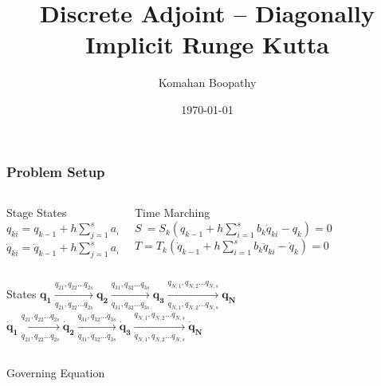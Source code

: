 \documentclass{beamer}
\title[\hspace{-0.2cm} DIRK Adjoint]
{
Discrete Adjoint -- Diagonally Implicit Runge Kutta
}
\author[Komahan Boopathy]
{
  \Large {Komahan Boopathy}\\
}
\institute
{
  \large Georgia Institute of Technology\\
 School of Aerospace Engineering\\
 Atlanta, GA
}
\date
{
\small \today
}
\begin{document}
\begin{frame}
  \titlepage
\end{frame}


\begin{frame}[allowframebreaks] \frametitle{Problem Setup}

  \begin{columns}[T] %
    \begin{column}{.42\textwidth}
      \begin{block}{Stage States}\medskip
        ${q_{ki}} = q_{k-1} + h \sum_{j=1}^s a_{ij} \dot{q}_{kj}$\\
        ${\dot{q}_{ki}} = \dot{q}_{k-1} + h \sum_{j=1}^s a_{ij} \ddot{q}_{kj}$
      \end{block}
    \end{column}%
    \hfill
    \begin{column}{.58\textwidth}
      \begin{block}{Time Marching}\medskip
        $S ~= S_k(q_{k-1} + h \sum_{i=1}^s b_k \dot{q}_{ki} - q_{k})  = 0$
        $T=T_k(\dot{q}_{k-1} + h \sum_{i=1}^s b_k \ddot{q}_{ki} - \dot{q}_{k})  = 0$
      \end{block}
    \end{column}%
  \end{columns}
  \medskip
  \begin{block}{States}\centering
    $\mathbf{q_1} \xrightarrow[\dot{q}_{21},\dot{q}_{22}\ldots\dot{q}_{2s}]{q_{21},q_{22}\ldots q_{2s}} \mathbf{q_2} \xrightarrow[\dot{q}_{31},\dot{q}_{32}\ldots\dot{q}_{3s}]{q_{31},q_{32}\ldots q_{3s}} \mathbf{q_3} \xrightarrow[\dot{q}_{N,1},\dot{q}_{N,2}\ldots\dot{q}_{N,s}]{q_{N,1},q_{N,2}\ldots q_{N,s}} \mathbf{q_N}$
    $\mathbf{\dot{q}_1} \xrightarrow[\ddot{q}_{21},\ddot{q}_{22}\ldots\ddot{q}_{2s}]{\dot{q}_{21},\dot{q}_{22}\ldots \dot{q}_{2s}} \mathbf{\dot{q}_2} \xrightarrow[\ddot{q}_{31},\ddot{q}_{32}\ldots\ddot{q}_{3s}]{\dot{q}_{31},\dot{q}_{32}\ldots \dot{q}_{3s}} \mathbf{\dot{q}_3} \xrightarrow[\ddot{q}_{N,1},\ddot{q}_{N,2}\ldots\ddot{q}_{N,s}]{\dot{q}_{N,1},\dot{q}_{N,2}\ldots \dot{q}_{N,s}} \mathbf{\dot{q}_N}$
  \end{block}
  \medskip
  \begin{columns}[T] %
    \begin{column}{.48\textwidth}
      \begin{block}{Governing Equation}\centering

\end{block}
\end{column}
\end{columns}
\end{frame}
\end{document}
